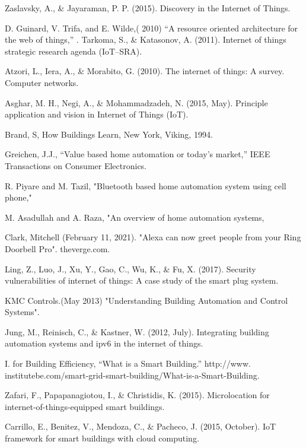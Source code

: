 \documentclass[conference]{IEEEtran}
\begin{document}
\begin{thebibliography}{00}
	
Zaslavsky, A., \& Jayaraman, P. P. (2015). Discovery in the Internet of Things. 
 
 D. Guinard, V. Trifa, and E. Wilde,( 2010) “A resource oriented architecture for the web of things,”
.
 Tarkoma, S., \& Katasonov, A. (2011). Internet of things strategic research agenda (IoT–SRA). 
 
 Atzori, L., Iera, A., \& Morabito, G. (2010). The internet of things: A survey. Computer networks.
 
 Asghar, M. H., Negi, A., \& Mohammadzadeh, N. (2015, May). Principle application and vision in Internet of Things (IoT). 
 
 Brand, S, How Buildings Learn, New York, Viking, 1994. 
 
 Greichen, J.J., “Value based home automation or today's market,” IEEE Transactions on Consumer Electronics.
 
 R. Piyare and M. Tazil, "Bluetooth based home automation system using cell phone," 

 M. Asadullah and A. Raza, "An overview of home automation systems,

 Clark, Mitchell (February 11, 2021). "Alexa can now greet people from your Ring Doorbell Pro". theverge.com. 

Ling, Z., Luo, J., Xu, Y., Gao, C., Wu, K., \& Fu, X. (2017). Security vulnerabilities of internet of things: A case study of the smart plug system.

KMC Controls.(May 2013) "Understanding Building Automation and Control Systems". 

 Jung, M., Reinisch, C., \& Kastner, W. (2012, July). Integrating building automation systems and ipv6 in the internet of things. 


I. for Building Efficiency, “What is a Smart Building.” http://www.
institutebe.com/smart-grid-smart-building/What-is-a-Smart-Building.


Zafari, F., Papapanagiotou, I., \& Christidis, K. (2015). Microlocation for internet-of-things-equipped smart buildings. 

 Carrillo, E., Benitez, V., Mendoza, C., \& Pacheco, J. (2015, October). IoT framework for smart buildings with cloud computing. 

\end{thebibliography}
\end{document}
